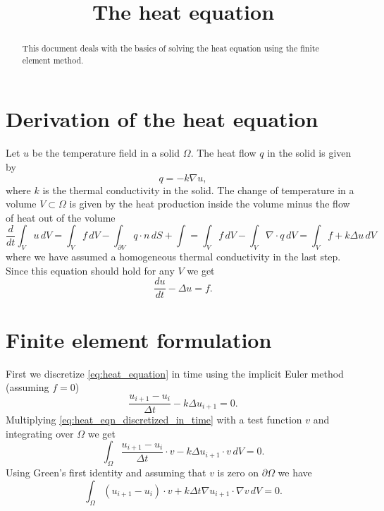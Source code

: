 \documentclass[a4paper,10pt]{article}
\begin{document}
\title{The heat equation}
\maketitle

\begin{abstract}
\noindent
This document deals with the basics of solving the heat equation using the
finite element method.
\end{abstract}

\section{Derivation of the heat equation}
Let $u$ be the temperature field in a solid $\Omega$. The heat flow $q$ in the
solid is given by
\[
q = -k \nabla u,
\]
where $k$ is the thermal conductivity in the solid. The change of temperature
in a volume $V \subset \Omega$ is given by the heat production inside the volume
minus the flow of heat out of the volume
\[
\frac{d}{dt} \int_V u \, dV
= \int_V f \, dV -\int_{\partial V} q \cdot n \, dS + \int
= \int_V f \, dV - \int_V \nabla \cdot q \, dV
= \int_V f + k \Delta u \, dV
\]
where we have assumed a homogeneous thermal conductivity in the last step. Since
this equation should hold for any $V$ we get
\begin{equation} \label{eq:heat_equation}
\frac{du}{dt} - \Delta u = f.
\end{equation}

\section{Finite element formulation}
First we discretize \eqref{eq:heat_equation} in time using the implicit Euler
method (assuming $f = 0$)
\begin{equation} \label{eq:heat_eqn_discretized_in_time}
\frac{u_{i + 1} - u_i}{\Delta t} - k \Delta u_{i + 1} = 0.
\end{equation}
Multiplying \eqref{eq:heat_eqn_discretized_in_time} with a test function $v$ and
integrating over $\Omega$ we get
\[
\int_{\Omega} \frac{u_{i + 1} - u_i}{\Delta t} \cdot v - k \Delta u_{i + 1} \cdot v \, dV = 0.
\]
Using Green's first identity and assuming that $v$ is zero on $\partial \Omega$
we have
\[
\int_{\Omega} (u_{i + 1} - u_i) \cdot v + k \Delta t \nabla u_{i + 1} \cdot \nabla v \, dV = 0.
\]
\end{document}
